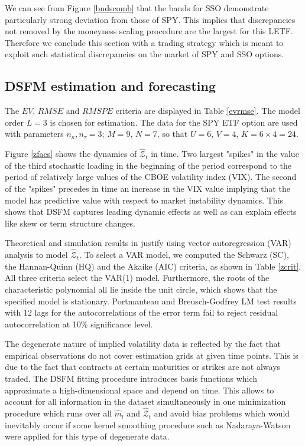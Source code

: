 \documentclass{rQUF2e}
\theoremstyle{plain}
\theoremstyle{definition}
\begin{document}
	We can see from Figure \ref{bndscomb} that the bands for SSO demonstrate particularly strong deviation from those of SPY. This implies that discrepancies not removed by the moneyness scaling procedure are the largest for this LETF. Therefore we conclude this section with a trading strategy which is meant to exploit such statistical discrepancies on the market of SPY and SSO options.
	
	
	\subsection{DSFM estimation and forecasting}
	\label{emptest}
	
	The $EV$, $RMSE$ and $RMSPE$ criteria are displayed in Table \ref{evrmse}. The model order $L = 3$ is chosen for estimation. The data for the SPY ETF option are used with parameters $n_{\kappa}, n_{\tau} = 3$; $M = 9$, $N = 7$, so that $U = 6$, $V = 4$, $K = 6 \times 4 = 24$.  
	
	Figure \ref{zfacs} shows the dynamics of $\widehat{\mathcal{Z}}_{t}$ in time. Two largest "spikes" in the value of the third stochastic loading in the beginning of the period correspond to the period of relatively large values of the CBOE volatility index (VIX). The second of the "spikes" precedes in time an increase in the VIX value implying that the model has predictive value with respect to market instability dynamics. This shows that DSFM captures leading dynamic effects as well as can explain effects like skew or term structure changes.
	
	Theoretical and simulation results in \citet{park_et_al} justify using vector autoregression (VAR) analysis to model $\widehat{\mathcal{Z}}_{t}$. To select a VAR model, we computed the Schwarz (SC), the Hannan-Quinn (HQ) and the Akaike (AIC) criteria, as shown in Table \ref{zcrit}. All three criteria select the VAR(1) model. Furthermore, the roots of the characteristic polynomial all lie inside the unit circle, which shows that the specified model is stationary. Portmanteau and Breusch-Godfrey LM test results with 12 lags for the autocorrelations of the error term fail to reject residual autocorrelation at 10\% significance level.   
	
	The degenerate nature of implied volatility data is reflected by the fact that empirical observations do not cover estimation grids at given time points. This is due to the fact that contracts at certain maturities or strikes are not always traded. The DSFM fitting procedure introduces basis functions which approximate a high-dimensional space and depend on time. This allows to account for all information in the dataset simultaneously in one minimization procedure which runs over all $\widehat{m}_l$ and $\widehat{\mathcal{Z}}_{t}$ and avoid bias problems which would inevitably occur if some kernel smoothing procedure such as Nadaraya-Watson were applied for this type of degenerate data.
	
\end{document}
